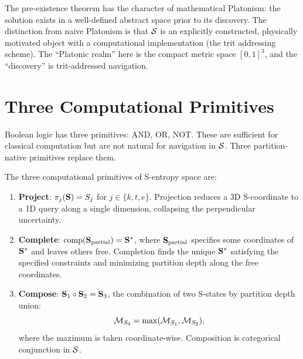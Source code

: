 \begin{remark}
The pre-existence theorem has the character of mathematical Platonism: the
solution exists in a well-defined abstract space prior to its discovery.
The distinction from naive Platonism is that $\mathcal{S}$ is an explicitly
constructed, physically motivated object with a computational implementation
(the trit addressing scheme). The ``Platonic realm'' here is the compact
metric space $[0,1]^3$, and the ``discovery'' is trit-addressed navigation.
\end{remark}

\section{Three Computational Primitives}
\label{sec:three_primitives}

Boolean logic has three primitives: AND, OR, NOT. These are sufficient for
classical computation but are not natural for navigation in $\mathcal{S}$.
Three partition-native primitives replace them.

\begin{definition}
\label{def:s_primitives}
The three computational primitives of S-entropy space are:
\begin{enumerate}[label=(\roman*)]
  \item \textbf{Project}: $\pi_j(\mathbf{S}) = S_j$ for $j \in \{k, t, e\}$.
        Projection reduces a 3D S-coordinate to a 1D query along a single
        dimension, collapsing the perpendicular uncertainty.
  \item \textbf{Complete}: $\mathrm{comp}(\mathbf{S}_{\mathrm{partial}}) = \mathbf{S}^*$,
        where $\mathbf{S}_{\mathrm{partial}}$ specifies some coordinates of
        $\mathbf{S}^*$ and leaves others free. Completion finds the unique
        $\mathbf{S}^*$ satisfying the specified constraints and minimizing
        partition depth along the free coordinates.
  \item \textbf{Compose}: $\mathbf{S}_1 \circ \mathbf{S}_2 = \mathbf{S}_3$, the
        combination of two S-states by partition depth union:
        \begin{equation}
          \mathcal{M}_{S_3} = \max(\mathcal{M}_{S_1}, \mathcal{M}_{S_2}),
          \label{eq:compose}
        \end{equation}
        where the maximum is taken coordinate-wise. Composition is categorical
        conjunction in $\mathcal{S}$.
\end{enumerate}
\end{definition}

